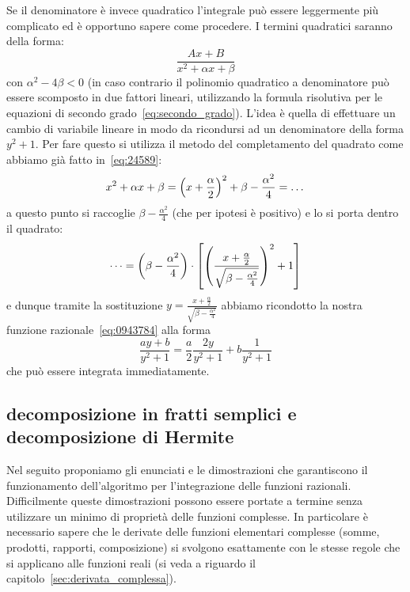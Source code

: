 Se il denominatore è invece quadratico l'integrale può essere leggermente più complicato ed è opportuno sapere come procedere. I termini quadratici
saranno della forma:
\begin{equation}\label{eq:0943784}
\frac{Ax + B}{x^2 + \alpha x + \beta}
\end{equation}
con $\alpha^2-4\beta<0$ (in caso contrario il polinomio quadratico
a denominatore può essere scomposto in due fattori lineari, utilizzando
la formula risolutiva per le equazioni di secondo grado~\eqref{eq:secondo_grado}). L'idea è quella di effettuare un cambio
di variabile lineare in modo da ricondursi ad un denominatore
della forma $y^2+1$. Per fare questo si utilizza il metodo del completamento del quadrato come abbiamo già fatto in~\eqref{eq:24589}:
\[
  x^2 + \alpha x + \beta
  = {\left( x+\frac\alpha 2 \right)}^2  + \beta - \frac{\alpha^2}{4}
  = \dots
\]
a questo punto si raccoglie $\beta-\frac{\alpha^2}{4}$
(che per ipotesi è positivo)
e lo si porta dentro il quadrato:
\[
 \dots = {\left( \beta-\frac{\alpha^2}{4} \right)}\cdot{\left[ {\left( \frac{x+\frac \alpha 2}{\sqrt{\beta -\frac{\alpha^2}{4}}} \right)}^2 + 1 \right]}
\]
e dunque tramite la sostituzione $y=\frac{x + \frac \alpha 2 }{\sqrt{\beta - \frac{\alpha^2}{4}}}$
abbiamo ricondotto la nostra funzione razionale~\eqref{eq:0943784}
alla forma
\[
  \frac{a y + b}{y^2 + 1} = \frac a 2 \frac{2y}{y^2+1} + b\frac{1}{y^2+1}
\]
che può essere integrata immediatamente.

\subsection{decomposizione in fratti semplici e decomposizione di Hermite}
%
%
%
%

Nel seguito proponiamo gli enunciati e le dimostrazioni che garantiscono
il funzionamento dell'algoritmo per l'integrazione delle funzioni razionali.
Difficilmente queste dimostrazioni possono essere portate a termine
senza utilizzare un minimo di proprietà delle funzioni complesse. In particolare è necessario sapere che le derivate delle funzioni elementari
complesse (somme, prodotti, rapporti, composizione) si svolgono esattamente
con le stesse regole che si applicano alle funzioni reali (si veda a riguardo il capitolo~\ref{sec:derivata_complessa}).


